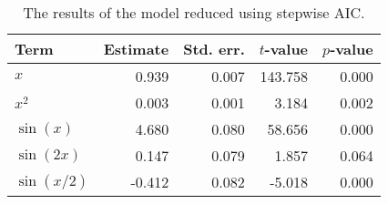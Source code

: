 \begin{table}[t]

\caption{\label{tab:stepwise-regression}The results of the model reduced using stepwise \ac{AIC}.}
\centering
\begin{tabular}{lrrrr}
\toprule
Term & Estimate & Std. err. & \(t\)-value & \(p\)-value\\
\midrule
\(x\) & 0.939 & 0.007 & 143.758 & 0.000\\
\(x^2\) & 0.003 & 0.001 & 3.184 & 0.002\\
\(\sin(x)\) & 4.680 & 0.080 & 58.656 & 0.000\\
\(\sin(2x)\) & 0.147 & 0.079 & 1.857 & 0.064\\
\(\sin(x/2)\) & -0.412 & 0.082 & -5.018 & 0.000\\
\bottomrule
\end{tabular}
\end{table}